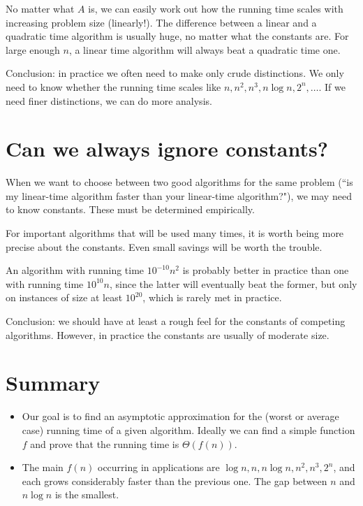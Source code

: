 No matter what $A$ is, we can easily work out how the running time
scales with increasing problem size (linearly!). The difference between a linear and a quadratic time algorithm is
usually huge, no matter what the constants are. For large enough $n$, a
linear time algorithm will always beat a quadratic time one. 

Conclusion: in practice we often need to make only crude distinctions. 
We only need to know whether the running time scales like $n, n^2, n^3, n \log n, 2^n, \dots$. 
If we need finer distinctions, we can do more analysis.

\section{Can we always ignore constants?}
When we want to choose between two good algorithms for the same
problem (``is my linear-time algorithm faster than your linear-time
algorithm?"), we may need to know constants. These must be determined
empirically. 

For important algorithms that will be used many times, it is worth
being more precise about the constants. 
Even small savings will be worth the trouble. 

An algorithm with running time $10^{-10} n^2$ is probably better
in practice than one with running time $10^{10} n$, since the latter
will eventually beat the former, but only on instances of size at least $10^{20}$, 
which is rarely met in practice. 

Conclusion: we should have at least a rough feel for the constants
of competing algorithms. However, in practice the constants are usually
of moderate size. 

\section{Summary}
\begin{itemize}
\item Our goal is to find an asymptotic approximation for the (worst or average 
case) running time of a given algorithm. Ideally we can find a simple function 
$f$ and prove that the running time is $\Theta(f(n))$.
\item The main $f(n)$ occurring in applications are $\log n, n, n \log n, n^2, n^3, 2^n$, and 
each grows considerably faster than the previous one. The gap between $n$ and 
$n \log n$ is the smallest.
\end{itemize}

